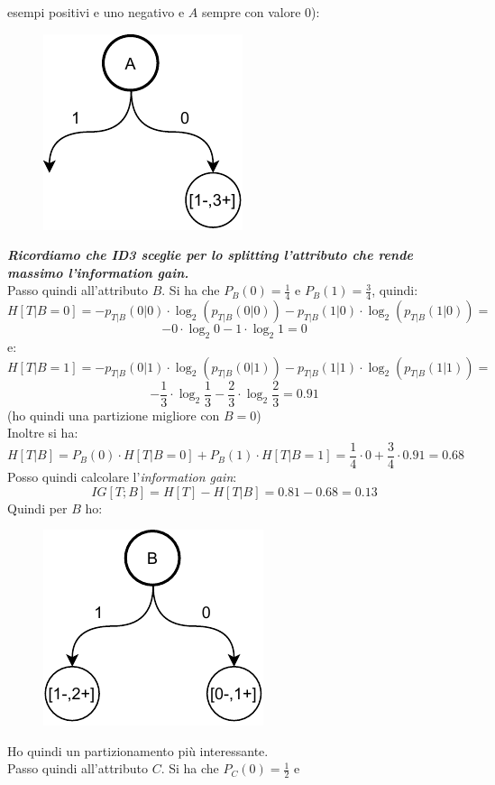 \begin{esempio}
  esempi positivi e uno negativo e $A$ sempre con valore 0):
  \begin{figure}[H]
    \centering
    \includegraphics[scale = 0.9]{img/id1.pdf}
  \end{figure}
 \textbf{\textit{Ricordiamo che ID3 sceglie per lo splitting l'attributo che
     rende massimo l'information gain.}}\\
  Passo quindi all'attributo $B$. Si ha che $P_B(0)=\frac{1}{4}$ e
  $P_B(1)=\frac{3}{4}$, quindi:
  \[H[T|B=0]=-p_{T|B}(0|0)\cdot \log_2(p_{T|B}(0|0))-p_{T|B}(1|0)\cdot
    \log_2(p_{T|B}(1|0))=\]
  \[-0\cdot \log_2 0-1\cdot \log_2 1=0\]
  e:
  \[H[T|B=1]=-p_{T|B}(0|1)\cdot \log_2(p_{T|B}(0|1))-p_{T|B}(1|1)\cdot
    \log_2(p_{T|B}(1|1))=\]
  \[-\frac{1}{3}\cdot\log_2\frac{1}{3}-
    \frac{2}{3}\cdot\log_2\frac{2}{3}=0.91\]
  (ho quindi una partizione migliore con $B=0$)\\
  Inoltre si ha:
  \[H[T|B]=P_B(0)\cdot H[T|B=0]+P_B(1)\cdot H[T|B=1]=\frac{1}{4}\cdot
    0+\frac{3}{4}\cdot 0.91=0.68\]
  Posso quindi calcolare l'\textit{information gain}:
  \[IG[T;B]=H[T]-H[T|B]=0.81-0.68=0.13\]
  Quindi per $B$ ho:
  \begin{figure}[H]
    \centering
    \includegraphics[scale = 0.9]{img/id2.pdf}
  \end{figure}
  Ho quindi un partizionamento più interessante.\\
  Passo quindi all'attributo $C$. Si ha che $P_C(0)=\frac{1}{2}$ e

\end{esempio}

